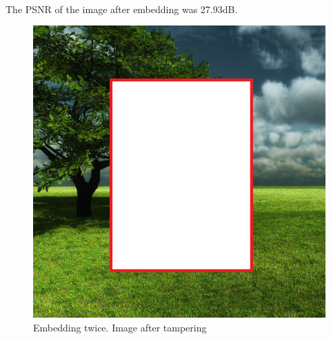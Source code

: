 \documentclass[12pt]{article}
\begin{document}
\hspace{0pt} \\
The PSNR of the image after embedding was 27.93dB.

\begin{figure}[h]
\centerline{%
\includegraphics[scale=0.45]{"Tree Embed twice 0.8 threshold/finalImage - Copy"}%
}%
\caption{Embedding twice. Image after tampering}
\label{fig:treeEmbedTwiceTamper}
\end{figure}
\end{document}
